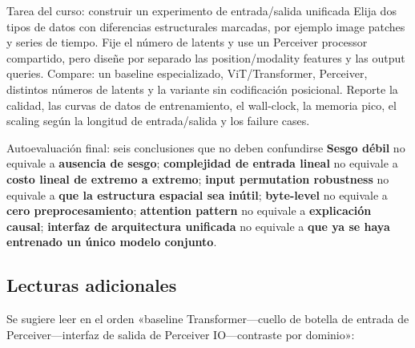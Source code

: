 \begin{importantbox}{Tarea del curso: construir un experimento de entrada/salida unificada}
Elija dos tipos de datos con diferencias estructurales marcadas, por ejemplo image patches y series de tiempo. Fije el número de latents y use un Perceiver processor compartido, pero diseñe por separado las position/modality features y las output queries. Compare: un baseline especializado, ViT/Transformer, Perceiver, distintos números de latents y la variante sin codificación posicional. Reporte la calidad, las curvas de datos de entrenamiento, el wall-clock, la memoria pico, el scaling según la longitud de entrada/salida y los failure cases.
\end{importantbox}

\begin{warningbox}{Autoevaluación final: seis conclusiones que no deben confundirse}
\textbf{Sesgo débil} no equivale a \textbf{ausencia de sesgo}; \textbf{complejidad de entrada lineal} no equivale a \textbf{costo lineal de extremo a extremo}; \textbf{input permutation robustness} no equivale a \textbf{que la estructura espacial sea inútil}; \textbf{byte-level} no equivale a \textbf{cero preprocesamiento}; \textbf{attention pattern} no equivale a \textbf{explicación causal}; \textbf{interfaz de arquitectura unificada} no equivale a \textbf{que ya se haya entrenado un único modelo conjunto}.
\end{warningbox}

\subsection{Lecturas adicionales}

Se sugiere leer en el orden «baseline Transformer—cuello de botella de entrada de Perceiver—interfaz de salida de Perceiver IO—contraste por dominio»:

